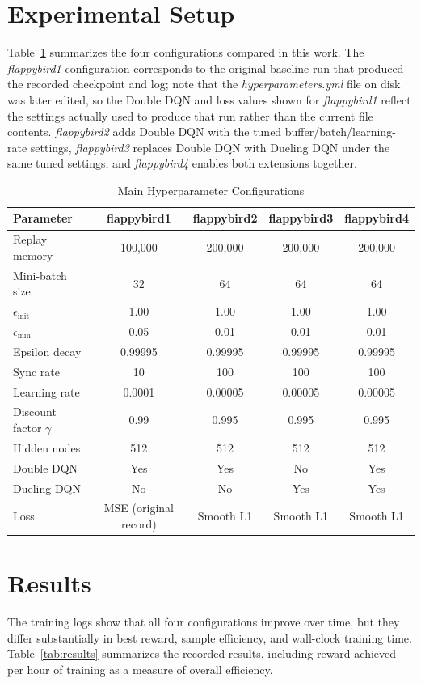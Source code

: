 \documentclass[conference]{IEEEtran}
\begin{document}
\section{Experimental Setup}
Table~\ref{tab:hyperparameters} summarizes the four configurations compared in this work. The \textit{flappybird1} configuration corresponds to the original baseline run that produced the recorded checkpoint and log; note that the \textit{hyperparameters.yml} file on disk was later edited, so the Double DQN and loss values shown for \textit{flappybird1} reflect the settings actually used to produce that run rather than the current file contents. \textit{flappybird2} adds Double DQN with the tuned buffer/batch/learning-rate settings, \textit{flappybird3} replaces Double DQN with Dueling DQN under the same tuned settings, and \textit{flappybird4} enables both extensions together.

\begin{table}[htbp]
\caption{Main Hyperparameter Configurations}
\label{tab:hyperparameters}
\centering
\begin{tabular}{lcccc}
\toprule
\textbf{Parameter} & \textbf{flappybird1} & \textbf{flappybird2} & \textbf{flappybird3} & \textbf{flappybird4} \\
\midrule
Replay memory & 100,000 & 200,000 & 200,000 & 200,000 \\
Mini-batch size & 32 & 64 & 64 & 64 \\
$\epsilon_{\text{init}}$ & 1.00 & 1.00 & 1.00 & 1.00 \\
$\epsilon_{\text{min}}$ & 0.05 & 0.01 & 0.01 & 0.01 \\
Epsilon decay & 0.99995 & 0.99995 & 0.99995 & 0.99995 \\
Sync rate & 10 & 100 & 100 & 100 \\
Learning rate & 0.0001 & 0.00005 & 0.00005 & 0.00005 \\
Discount factor $\gamma$ & 0.99 & 0.995 & 0.995 & 0.995 \\
Hidden nodes & 512 & 512 & 512 & 512 \\
Double DQN & Yes & Yes & No & Yes \\
Dueling DQN & No & No & Yes & Yes \\
Loss & MSE (original record) & Smooth L1 & Smooth L1 & Smooth L1 \\
\bottomrule
\end{tabular}
\end{table}

\section{Results}
The training logs show that all four configurations improve over time, but they differ substantially in best reward, sample efficiency, and wall-clock training time. Table~\ref{tab:results} summarizes the recorded results, including reward achieved per hour of training as a measure of overall efficiency.
\end{document}
